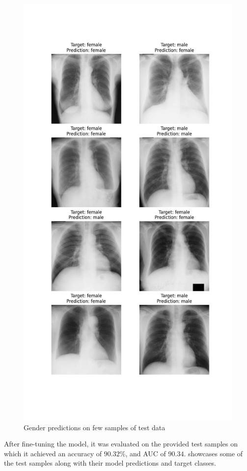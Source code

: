     \begin{figure}[!htbp]
        \centering
        \includegraphics[width=\linewidth]{../outputs/gender/gender1/test-results.png}
        \caption{Gender predictions on few samples of test data}
        \label{fig:gender-results}
    \end{figure} 

    After fine-tuning the model, it was evaluated on the provided test samples on which it achieved an accuracy of $90.32\%$, and AUC of $90.34$.  showcases some of the test samples along with their model predictions and target classes.
